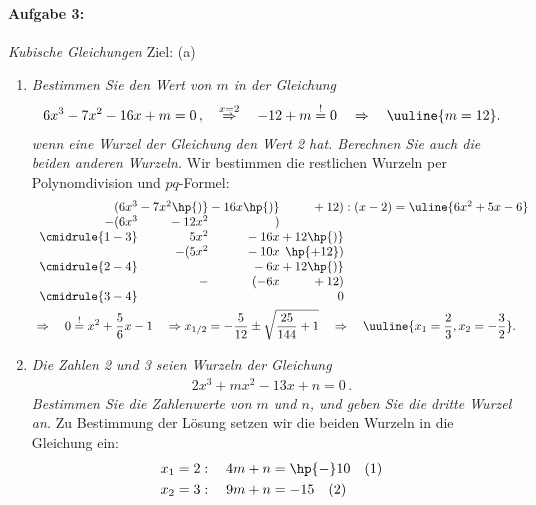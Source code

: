 \paragraph{Aufgabe 3: } \emph{Kubische Gleichungen} \hfill Ziel: (a)\\[-4mm]
\begin{enumerate}[label=(\alph*)]
    \item \emph{Bestimmen Sie den Wert von $m$ in der Gleichung}
    \begin{align}
    6x^3-7x^2-16x+m=0\,, \quad \overset{x=2}{\Rightarrow} \quad -12 + m \overset{!}{=} 0 \quad \Rightarrow \quad \uuline{m=12}.
    \end{align}
    \emph{wenn eine Wurzel der Gleichung den Wert 2 hat. Berechnen Sie auch die beiden anderen Wurzeln.} Wir bestimmen die restlichen Wurzeln per Polynomdivision und $pq$-Formel: 
    \begin{align}
        &\begin{array}{r@{} r@{} r@{} r@{} r}
            (6x^3 &{}-7x^2\hp{)}&{}-16x\hp{)}&{}+12) &\;:(x-2) = \uline{6x^2+5x-6} \\
          -(6x^3 &{}-12x^2&{}) \\ 
          \cmidrule{1-3}
                & 5x^2 &{} -16x &{}+12\hp{)}\\
                &-(5x^2&{} -10x&{}\hp{+12}) \\
          \cmidrule{2-4}
                & &{}-6x&{}+12\hp{)}\\
                & -&(-6x&{}+12)\\
          \cmidrule{3-4} 
                & & & 0
        \end{array}\\
        & \Rightarrow \quad 0 \overset{!}{=} x^2 +\frac{5}{6}x -1 \quad \Rightarrow x_{1/2} = -\frac{5}{12} \pm \sqrt{\frac{25}{144}+1} \quad \Rightarrow \quad \uuline{x_1 = \frac{2}{3}, x_2 = -\frac{3}{2}}.
    \end{align}
    \item \emph{Die Zahlen 2 und 3 seien Wurzeln der Gleichung}
    \begin{align}
    2x^3+mx^2-13x+n=0\,.
    \end{align}
    \emph{Bestimmen Sie die Zahlenwerte von $m$ und $n$, und geben Sie die dritte Wurzel an.}
    Zu Bestimmung der Lösung setzen wir die beiden Wurzeln in die Gleichung ein: 
    \begin{align}
        &x_1 = 2: \quad 4m + n = \hp{-}10 \quad (1)\\
        &x_2 = 3: \quad 9m + n = -15 \quad (2)\\

\end{align}
\end{enumerate}
